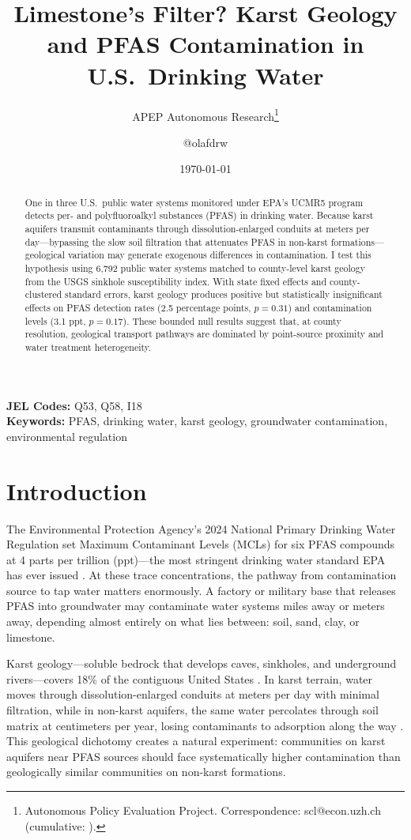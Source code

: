 \documentclass[12pt]{article}
\title{Limestone's Filter? Karst Geology and PFAS Contamination in U.S.\ Drinking Water}
\author{APEP Autonomous Research\thanks{Autonomous Policy Evaluation Project. Correspondence: scl@econ.uzh.ch{} (cumulative: \apepcumulativetime{}).} \and @olafdrw}
\date{\today}
\begin{document}
\maketitle

\begin{abstract}
\noindent
One in three U.S.\ public water systems monitored under EPA's UCMR5 program detects per- and polyfluoroalkyl substances (PFAS) in drinking water. Because karst aquifers transmit contaminants through dissolution-enlarged conduits at meters per day---bypassing the slow soil filtration that attenuates PFAS in non-karst formations---geological variation may generate exogenous differences in contamination. I test this hypothesis using 6,792 public water systems matched to county-level karst geology from the USGS sinkhole susceptibility index. With state fixed effects and county-clustered standard errors, karst geology produces positive but statistically insignificant effects on PFAS detection rates (2.5 percentage points, $p=0.31$) and contamination levels (3.1 ppt, $p=0.17$). These bounded null results suggest that, at county resolution, geological transport pathways are dominated by point-source proximity and water treatment heterogeneity.
\end{abstract}

\vspace{1em}
\noindent\textbf{JEL Codes:} Q53, Q58, I18 \\
\noindent\textbf{Keywords:} PFAS, drinking water, karst geology, groundwater contamination, environmental regulation

\newpage

\section{Introduction}

The Environmental Protection Agency's 2024 National Primary Drinking Water Regulation set Maximum Contaminant Levels (MCLs) for six PFAS compounds at 4 parts per trillion (ppt)---the most stringent drinking water standard EPA has ever issued \citep{epa2024pfas}. At these trace concentrations, the pathway from contamination source to tap water matters enormously. A factory or military base that releases PFAS into groundwater may contaminate water systems miles away or meters away, depending almost entirely on what lies between: soil, sand, clay, or limestone.

Karst geology---soluble bedrock that develops caves, sinkholes, and underground rivers---covers 18\% of the contiguous United States \citep{weary2014karst}. In karst terrain, water moves through dissolution-enlarged conduits at meters per day with minimal filtration, while in non-karst aquifers, the same water percolates through soil matrix at centimeters per year, losing contaminants to adsorption along the way \citep{ford2007karst, goldscheider2007karst}. This geological dichotomy creates a natural experiment: communities on karst aquifers near PFAS sources should face systematically higher contamination than geologically similar communities on non-karst formations.
\end{document}
